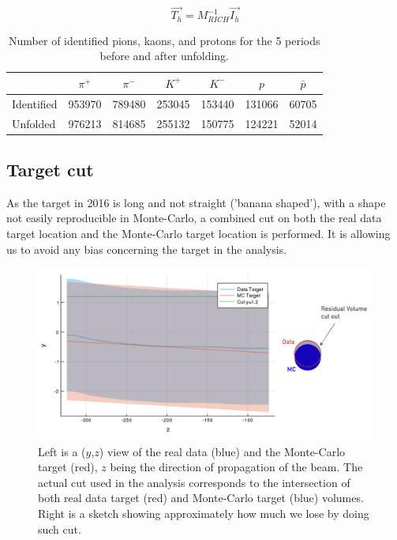 \documentclass[letterpaper,12pt]{article}
\begin{document}
\begin{equation}
  \overrightarrow{T_h} = M^{-1}_{RICH}\overrightarrow{I_h}
	\label{richmat}
\end{equation}

\begin{table}[!h]
  \caption{\label{HadNum} Number of identified pions, kaons, and protons for the 5 periods before and after unfolding.}
  \centering
  \begin{tabular}{lcccccc}
    \hline
     & $\pi^+$ & $\pi^-$ & $K^+$ & $K^-$ & $p$ & $\bar{p}$ \\
    \hline
    Identified & 953970 & 789480 & 253045 & 153440 & 131066 & 60705 \\
    Unfolded & 976213 & 814685 & 255132 & 150775 & 124221 & 52014 \\
    \hline
  \end{tabular}
\end{table}

\subsection{Target cut}

As the target in 2016 is long and not straight ('banana shaped'), with a shape not easily reproducible in Monte-Carlo, a combined cut on both the real data target location and the Monte-Carlo target location is performed. It is allowing us to avoid any bias concerning the target in the analysis.

\begin{figure}[!h]
	\includegraphics[scale=0.4]{./gfx/Target.png}
	\caption{Left is a ($y$,$z$) view of the real data (blue) and the Monte-Carlo target (red), $z$ being the direction of propagation of the beam. The actual cut used in the analysis corresponds to the intersection of both real data target (red) and Monte-Carlo target (blue) volumes. Right is a sketch showing approximately how much we lose by doing such cut.}
	\label{Target}
\end{figure}
\end{document}
